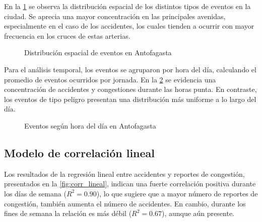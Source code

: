 \documentclass[12pt]{article}
\begin{document}
En la \cref{fig:dist_events} se observa la distribución espacial de los distintos tipos de eventos en la ciudad. Se aprecia una mayor concentración en las principales avenidas, especialmente en el caso de los accidentes, los cuales tienden a ocurrir con mayor frecuencia en los cruces de estas arterias.

\begin{figure}[H]
    \centering
    \caption{Distribución espacial de eventos en Antofagasta}
    \label{fig:dist_events}
\end{figure}

Para el análisis temporal, los eventos se agruparon por hora del día, calculando el promedio de eventos ocurridos por jornada. En la \cref{fig:time_events} se evidencia una concentración de accidentes y congestiones durante las horas punta. En contraste, los eventos de tipo peligro presentan una distribución más uniforme a lo largo del día.

\begin{figure}[H]
    \centering
    \newline
    \newline
    \newline
    \caption{Eventos según hora del día en Antofagasta}
    \label{fig:time_events}
\end{figure}

\subsection{Modelo de correlación lineal}

Los resultados de la regresión lineal entre accidentes y reportes de congestión, presentados en la \cref{fig:corr_lineal}, indican una fuerte correlación positiva durante los días de semana ($R^2 = 0.90$), lo que sugiere que a mayor número de reportes de congestión, también aumenta el número de accidentes. En cambio, durante los fines de semana la relación es más débil ($R^2 = 0.67$), aunque aún presente.
\end{document}
